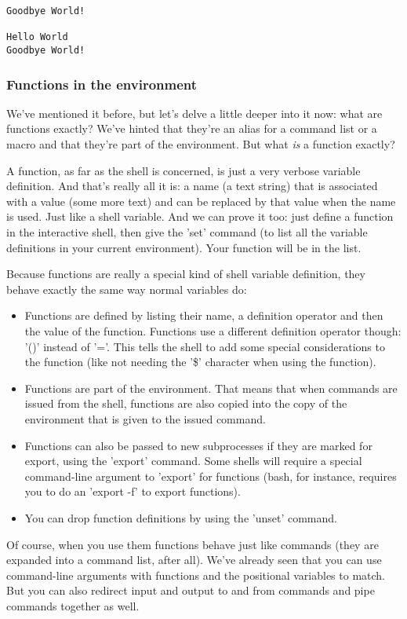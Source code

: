 \scriptsize
\begin{verbatim}
Goodbye World!

Hello World
Goodbye World!
\end{verbatim}
\normalsize

\subsubsection{Functions in the environment}
We've mentioned it before, but let's delve a little deeper into it now: what
are functions exactly? We've hinted that they're an alias for a command list or
a macro and that they're part of the environment. But what \emph{is} a function
exactly?

A function, as far as the shell is concerned, is just a very verbose variable
definition. And that's really all it is: a name (a text string) that is
associated with a value (some more text) and can be replaced by that value when
the name is used. Just like a shell variable. And we can prove it too: just
define a function in the interactive shell, then give the 'set' command (to
list all the variable definitions in your current environment). Your function
will be in the list.

Because functions are really a special kind of shell variable definition, they
behave exactly the same way normal variables do:

\begin{itemize}
	\item Functions are defined by listing their name, a definition operator
and then the value of the function. Functions use a different definition
operator though: '()' instead of '='. This tells the shell to add some special
considerations to the function (like not needing the '\$' character when using
the function).
	\item Functions are part of the environment. That means that when commands
are issued from the shell, functions are also copied into the copy of the
environment that is given to the issued command.
	\item Functions can also be passed to new subprocesses if they are marked
for export, using the 'export' command. Some shells will require a special
command-line argument to 'export' for functions (bash, for instance, requires
you to do an 'export -f' to export functions).
	\item You can drop function definitions by using the 'unset' command.
\end{itemize}

Of course, when you use them functions behave just like commands (they are
expanded into a command list, after all). We've already seen that you can use
command-line arguments with functions and the positional variables to match.
But you can also redirect input and output to and from commands and pipe
commands together as well.
